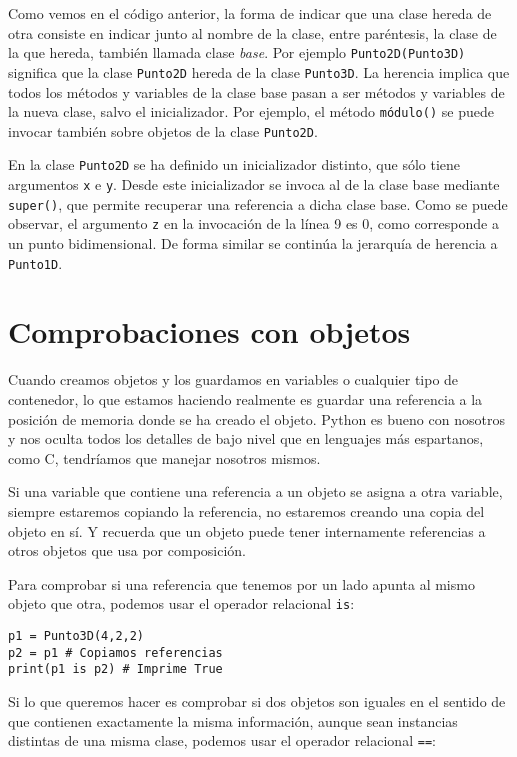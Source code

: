 Como vemos en el código anterior, la forma de indicar que una clase hereda de otra consiste en indicar junto al nombre de la clase, entre paréntesis, la clase de la que hereda, también llamada clase \emph{base}. Por ejemplo \texttt{Punto2D(Punto3D)} significa que la clase \texttt{Punto2D} hereda de la clase \texttt{Punto3D}. La herencia implica que todos los métodos y variables de la clase base pasan a ser métodos y variables de la nueva clase, salvo el inicializador. Por ejemplo, el método \texttt{módulo()} se puede invocar también sobre objetos de la clase \texttt{Punto2D}.

En la clase \texttt{Punto2D} se ha definido un inicializador distinto, que sólo tiene argumentos \texttt{x} e \texttt{y}. Desde este inicializador se invoca al de la clase base mediante \texttt{super()}, que permite recuperar una referencia a dicha clase base. Como se puede observar, el argumento \texttt{z} en la invocación de la línea 9 es 0, como corresponde a un punto bidimensional. De forma similar se continúa la jerarquía de herencia a \texttt{Punto1D}.

\section{Comprobaciones con objetos}

Cuando creamos objetos y los guardamos en variables o cualquier tipo de contenedor, lo que estamos haciendo realmente es guardar una referencia a la posición de memoria donde se ha creado el objeto. Python es bueno con nosotros y nos oculta todos los detalles de bajo nivel que en lenguajes más espartanos, como C, tendríamos que manejar nosotros mismos.

Si una variable que contiene una referencia a un objeto se asigna a otra variable, siempre estaremos copiando la referencia, no estaremos creando una copia del objeto en sí. Y recuerda que un objeto puede tener internamente referencias a otros objetos que usa por composición. 

Para comprobar si una referencia que tenemos por un lado apunta al mismo objeto que otra, podemos usar el operador relacional \texttt{is}:

\begin{lstlisting}
p1 = Punto3D(4,2,2)
p2 = p1 # Copiamos referencias
print(p1 is p2) # Imprime True
\end{lstlisting}

Si lo que queremos hacer es comprobar si dos objetos son iguales en el sentido de que contienen exactamente la misma información, aunque sean instancias distintas de una misma clase, podemos usar el operador relacional \texttt{==}:

